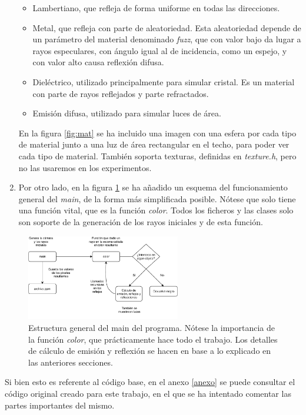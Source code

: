 \documentclass{scrbook}
\begin{document}
\begin{enumerate}
\begin{itemize}
		\item Lambertiano, que refleja de forma uniforme en todas las direcciones. 
		\item Metal, que refleja con parte de aleatoriedad. Esta aleatoriedad depende de un parámetro del material denominado \textit{fuzz}, que con valor bajo da lugar a rayos especulares, con ángulo igual al de incidencia, como un espejo, y con valor alto causa reflexión difusa.
		\item Dieléctrico, utilizado principalmente para simular cristal. Es un material con parte de rayos reflejados y parte refractados.
		\item Emisión difusa, utilizado para simular luces de área.
	\end{itemize}
	
	En la figura \ref{fig:mat} se ha incluido una imagen con una esfera por cada tipo de material junto a una luz de área rectangular en el techo, para poder ver cada tipo de material. También soporta texturas, definidas en \textit{texture.h}, pero no las usaremos en los experimentos.
	\item Por otro lado, en la figura \ref{fig:estructura} se ha añadido un esquema del funcionamiento general del \textit{main}, de la forma más simplificada posible. Nótese que solo tiene una función vital, que es la función \textit{color}. Todos los ficheros y las clases solo son soporte de la generación de los rayos iniciales y de esta función. 
\end{enumerate}

\begin{figure}[ht]
	\centering
	\includegraphics[width=0.6\textwidth]{estructurageneral}
	\caption{Estructura general del main del programa. Nótese la importancia de la función \textit{color}, que prácticamente hace todo el trabajo. Los detalles de cálculo de emisión y reflexión se hacen en base a lo explicado en las anteriores secciones.}
	\label{fig:estructura}
\end{figure}

Si bien esto es referente al código base, en el anexo \ref{anexo} se puede consultar el código original creado para este trabajo, en el que se ha intentado comentar las partes importantes del mismo.
\end{document}
